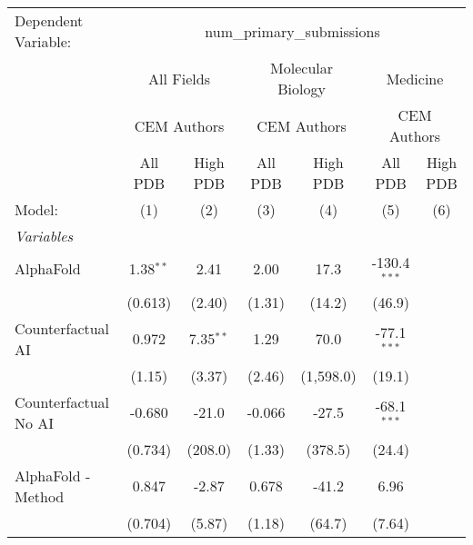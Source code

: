 \begingroup
\centering
\begin{tabular}{lcccccc}
   \tabularnewline \midrule \midrule
   Dependent Variable: & \multicolumn{6}{c}{num\_primary\_submissions}\\
 & \multicolumn{2}{c}{All Fields} & \multicolumn{2}{c}{Molecular Biology} & \multicolumn{2}{c}{Medicine} \\
\cmidrule(lr){2-3} \cmidrule(lr){4-5} \cmidrule(lr){6-7}
 & \multicolumn{2}{c}{CEM Authors} & \multicolumn{2}{c}{CEM Authors} & \multicolumn{2}{c}{CEM Authors} \\
\cmidrule(lr){2-3} \cmidrule(lr){4-5} \cmidrule(lr){6-7}
 & \multicolumn{1}{c}{All PDB} & \multicolumn{1}{c}{High PDB} & \multicolumn{1}{c}{All PDB} & \multicolumn{1}{c}{High PDB} & \multicolumn{1}{c}{All PDB} & \multicolumn{1}{c}{High PDB} \\
\cmidrule(lr){2-2} \cmidrule(lr){3-3} \cmidrule(lr){4-4} \cmidrule(lr){5-5} \cmidrule(lr){6-6} \cmidrule(lr){7-7}
   Model:                                                     & (1)         & (2)         & (3)     & (4)       & (5)            & (6)\\  
   \midrule
   \emph{Variables}\\
   AlphaFold                                                  & 1.38$^{**}$ & 2.41        & 2.00    & 17.3      & -130.4$^{***}$ &   \\   
                                                              & (0.613)     & (2.40)      & (1.31)  & (14.2)    & (46.9)         &   \\   
   Counterfactual AI                                          & 0.972       & 7.35$^{**}$ & 1.29    & 70.0      & -77.1$^{***}$  &   \\   
                                                              & (1.15)      & (3.37)      & (2.46)  & (1,598.0) & (19.1)         &   \\   
   Counterfactual No AI                                       & -0.680      & -21.0       & -0.066  & -27.5     & -68.1$^{***}$  &   \\   
                                                              & (0.734)     & (208.0)     & (1.33)  & (378.5)   & (24.4)         &   \\   
   AlphaFold - Method                                         & 0.847       & -2.87       & 0.678   & -41.2     & 6.96           &   \\   
                                                              & (0.704)     & (5.87)      & (1.18)  & (64.7)    & (7.64)         &   \\   

\end{tabular}
